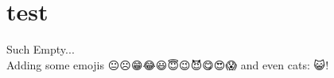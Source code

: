 \chapter{test}

Such Empty... \\
Adding some emojis {\DejaSans 😐☹😁😂😃😇😉😈😋😍😱} and even cats: {\DejaSans 😺}!